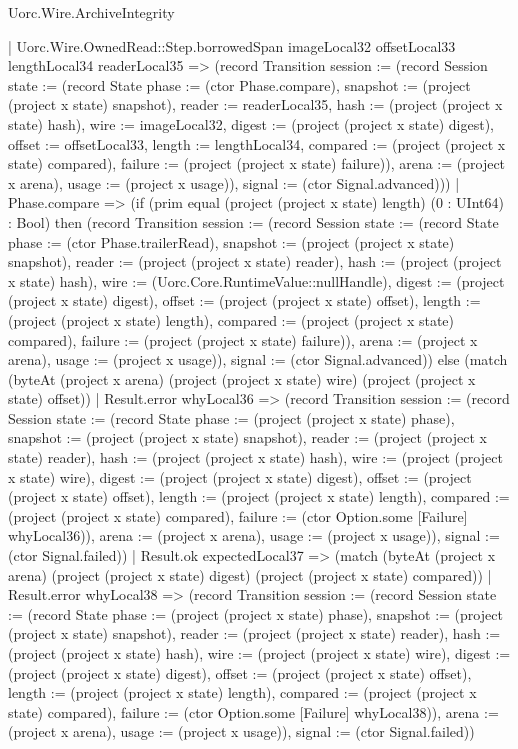 \begin{lexlean}{Uorc.Wire.ArchiveIntegrity}
\begin{semanticmodule}
{        | Uorc.Wire.OwnedRead::Step.borrowedSpan imageLocal32 offsetLocal33 lengthLocal34 readerLocal35 => (record Transition {session := (record Session {state := (record State {phase := (ctor Phase.compare), snapshot := (project (project x state) snapshot), reader := readerLocal35, hash := (project (project x state) hash), wire := imageLocal32, digest := (project (project x state) digest), offset := offsetLocal33, length := lengthLocal34, compared := (project (project x state) compared), failure := (project (project x state) failure)}), arena := (project x arena), usage := (project x usage)}), signal := (ctor Signal.advanced)}))
      | Phase.compare => (if (prim equal (project (project x state) length) (0 : UInt64) : Bool) then (record Transition {session := (record Session {state := (record State {phase := (ctor Phase.trailerRead), snapshot := (project (project x state) snapshot), reader := (project (project x state) reader), hash := (project (project x state) hash), wire := (Uorc.Core.RuntimeValue::nullHandle), digest := (project (project x state) digest), offset := (project (project x state) offset), length := (project (project x state) length), compared := (project (project x state) compared), failure := (project (project x state) failure)}), arena := (project x arena), usage := (project x usage)}), signal := (ctor Signal.advanced)}) else (match (byteAt (project x arena) (project (project x state) wire) (project (project x state) offset))
        | Result.error whyLocal36 => (record Transition {session := (record Session {state := (record State {phase := (project (project x state) phase), snapshot := (project (project x state) snapshot), reader := (project (project x state) reader), hash := (project (project x state) hash), wire := (project (project x state) wire), digest := (project (project x state) digest), offset := (project (project x state) offset), length := (project (project x state) length), compared := (project (project x state) compared), failure := (ctor Option.some [Failure] whyLocal36)}), arena := (project x arena), usage := (project x usage)}), signal := (ctor Signal.failed)})
        | Result.ok expectedLocal37 => (match (byteAt (project x arena) (project (project x state) digest) (project (project x state) compared))
          | Result.error whyLocal38 => (record Transition {session := (record Session {state := (record State {phase := (project (project x state) phase), snapshot := (project (project x state) snapshot), reader := (project (project x state) reader), hash := (project (project x state) hash), wire := (project (project x state) wire), digest := (project (project x state) digest), offset := (project (project x state) offset), length := (project (project x state) length), compared := (project (project x state) compared), failure := (ctor Option.some [Failure] whyLocal38)}), arena := (project x arena), usage := (project x usage)}), signal := (ctor Signal.failed)})
}
\end{semanticmodule}
\end{lexlean}
